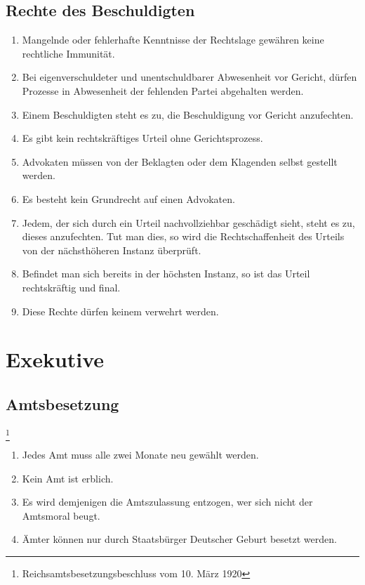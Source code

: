 \documentclass{article}
\begin{document}
\subsection{Rechte des Beschuldigten}
\begin{enumerate}[(1)]
    \item Mangelnde oder fehlerhafte Kenntnisse der Rechtslage gewähren keine rechtliche Immunität.
    \item Bei eigenverschuldeter und unentschuldbarer Abwesenheit vor Gericht, dürfen Prozesse in Abwesenheit der fehlenden Partei abgehalten werden.
    \item Einem Beschuldigten steht es zu, die Beschuldigung vor Gericht anzufechten.
    \item Es gibt kein rechtskräftiges Urteil ohne Gerichtsprozess.
    \item Advokaten müssen von der Beklagten oder dem Klagenden selbst gestellt werden.
    \item Es besteht kein Grundrecht auf einen Advokaten.
    \item Jedem, der sich durch ein Urteil nachvollziehbar geschädigt sieht, steht es zu, dieses anzufechten. Tut man dies, so wird die Rechtschaffenheit des Urteils von der nächsthöheren Instanz überprüft.
    \item Befindet man sich bereits in der höchsten Instanz, so ist das Urteil rechtskräftig und final.
    \item Diese Rechte dürfen keinem verwehrt werden.
\end{enumerate}

\section{Exekutive}
\subsection{Amtsbesetzung}\footnote{Reichsamtsbesetzungsbeschluss vom 10. März 1920}
\begin{enumerate}[(1)]
    \item Jedes Amt muss alle zwei Monate neu gewählt werden.
    \item Kein Amt ist erblich.
    \item Es wird demjenigen die Amtszulassung entzogen, wer sich nicht der Amtsmoral beugt.
    \item Ämter können nur durch Staatsbürger Deutscher Geburt besetzt werden.
\end{enumerate}
\end{document}
